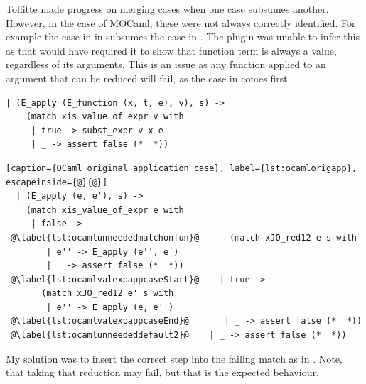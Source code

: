 \documentclass[12pt,twoside,notitlepage]{report}
\theoremstyle{plain}%
\theoremstyle{definition}
\theoremstyle{remark}
\begin{document}
Tollitte\cite{tollitte2012producing} made progress on merging cases when one case subsumes another. However, in the case of MOCaml, these were not always correctly identified. For example the case in  in  subsumes the case in . The plugin was unable to infer this as that would have required it to show that function term is always a value, regardless of its arguments. This is an issue as any function applied to an argument that can be reduced will fail, as the case in  comes first. 

\vspace{3mm}

\begin{minipage}{\linewidth}

\begin{lstlisting}[caption={OCaml original substitution case}, label={lst:ocamlorigsub}]
  | (E_apply (E_function (x, t, e), v), s) ->
    (match xis_value_of_expr v with
     | true -> subst_expr v x e
     | _ -> assert false (*  *))
\end{lstlisting}

\end{minipage}

\begin{minipage}{\linewidth}

\begin{lstlisting}[caption={OCaml original application case}, label={lst:ocamlorigapp}, escapeinside={@}{@}]
  | (E_apply (e, e'), s) ->
    (match xis_value_of_expr e with
     | false ->
 @\label{lst:ocamlunneededmatchonfun}@      (match xJO_red12 e s with
        | e'' -> E_apply (e'', e')
        | _ -> assert false (*  *))
 @\label{lst:ocamlvalexpappcaseStart}@    | true ->
       (match xJO_red12 e' s with
        | e'' -> E_apply (e, e'')
 @\label{lst:ocamlvalexpappcaseEnd}@       | _ -> assert false (*  *))
 @\label{lst:ocamlunneededdefault2}@    | _ -> assert false (*  *))
\end{lstlisting}

\end{minipage}
My solution was to insert the correct step into the failing match as in . Note, that taking that reduction may fail, but that is the expected behaviour.
\end{document}
